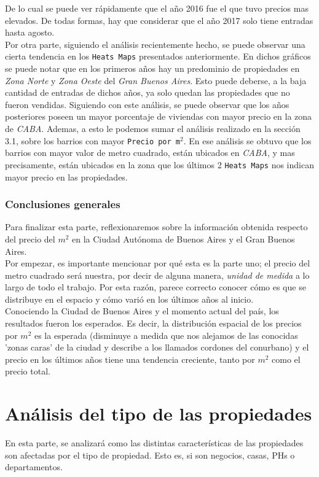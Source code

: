 \documentclass[a4paper, 10pt]{article}
\def\code#1{\texttt{#1}}
\newcommand\tab[1][0.5cm]{\hspace*{#1}}
\begin{document}
			\tab De lo cual se puede ver rápidamente que el año 2016 fue el que tuvo precios mas elevados. De todas formas, hay
			que considerar que el año 2017 solo tiene entradas hasta agosto. \\
       		\tab Por otra parte, siguiendo el análisis recientemente hecho, se puede observar una cierta tendencia en los
       		\code{Heats Maps} presentados anteriormente. En dichos gráficos se puede notar que en los primeros años hay un
       		predominio de propiedades en \textit{Zona Norte} y \textit{Zona Oeste} del \textit{Gran Buenos Aires}. Esto puede
       		deberse, a la baja cantidad de entradas de dichos años, ya solo quedan las propiedades que no fueron vendidas.
       		Siguiendo con este análisis, se puede observar que los años posteriores poseen un mayor porcentaje de viviendas con
       		mayor precio en la zona de \textit{CABA}. Ademas, a esto le podemos sumar el análisis realizado en la sección 3.1,
       		sobre los barrios con mayor \code{Precio por m$^2$}. En ese análisis se obtuvo que los barrios con mayor valor de
       		metro cuadrado, están ubicados en \textit{CABA}, y mas precisamente, están ubicados en la zona que los últimos
       		2 \code{Heats Maps} nos indican mayor precio en las propiedades.
		\section{Conclusiones generales}
			Para finalizar esta parte, reflexionaremos sobre la información obtenida respecto del precio del $m^2$ en la Ciudad
			Autónoma de Buenos Aires y el Gran Buenos Aires. \\
			\tab Por empezar, es importante mencionar por qué esta es la parte uno; el precio del metro cuadrado será nuestra, por
			decir de alguna manera, \emph{unidad de medida} a lo largo de todo el trabajo. Por esta razón, parece correcto conocer
			cómo es que se distribuye en el espacio y cómo varió en los últimos años al inicio. \\
			\tab Conociendo la Ciudad de Buenos Aires y el momento actual del país, los resultados fueron los esperados. Es decir,
			la distribución espacial de los precios por $m^2$ es la esperada (disminuye a medida que nos alejamos de las conocidas
			'zonas caras' de la ciudad y describe a los llamados cordones del conurbano) y el precio en los últimos años tiene una
			tendencia creciente, tanto por $m^2$ como el precio total.
		\part{Análisis del tipo de las propiedades}
		En esta parte, se analizará como las distintas características de las propiedades son afectadas por el tipo de propiedad.
		Esto es, si son negocios, casas, PHs o departamentos.
\end{document}
